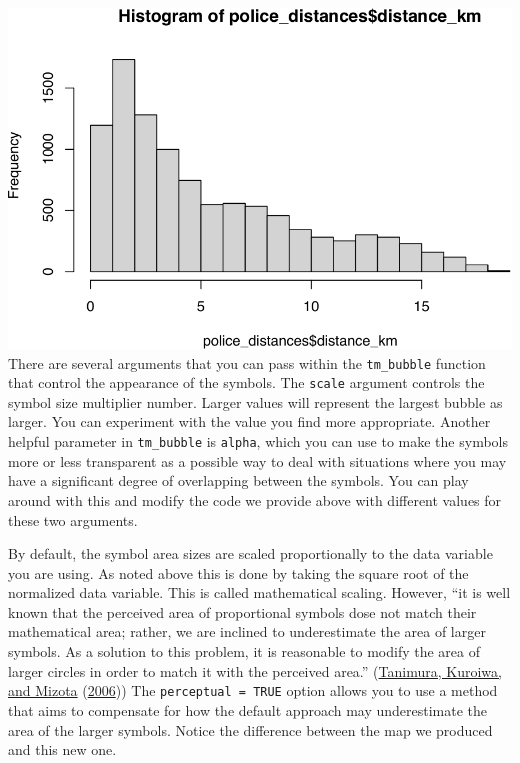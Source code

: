 \documentclass[
]{book}
\begin{document}
\includegraphics{crime_mapping_files/figure-latex/unnamed-chunk-71-1.pdf}
There are several arguments that you can pass within the \texttt{tm\_bubble} function that control the appearance of the symbols. The \texttt{scale} argument controls the symbol size multiplier number. Larger values will represent the largest bubble as larger. You can experiment with the value you find more appropriate. Another helpful parameter in \texttt{tm\_bubble} is \texttt{alpha}, which you can use to make the symbols more or less transparent as a possible way to deal with situations where you may have a significant degree of overlapping between the symbols. You can play around with this and modify the code we provide above with different values for these two arguments.

By default, the symbol area sizes are scaled proportionally to the data variable you are using. As noted above this is done by taking the square root of the normalized data variable. This is called mathematical scaling. However, ``it is well known that the perceived area of proportional symbols dose not match their mathematical area; rather, we are inclined to underestimate the area of larger symbols. As a solution to this problem, it is reasonable to modify the area of larger circles in order to match it with the perceived area.'' (\protect\hyperlink{ref-Tanimura_2006}{Tanimura, Kuroiwa, and Mizota} (\protect\hyperlink{ref-Tanimura_2006}{2006})) The \texttt{perceptual\ =\ TRUE} option allows you to use a method that aims to compensate for how the default approach may underestimate the area of the larger symbols. Notice the difference between the map we produced and this new one.
\end{document}
